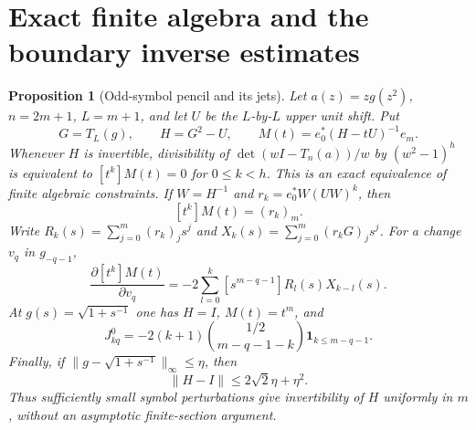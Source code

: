 \documentclass[11pt]{article}
\newtheorem{proposition}{Proposition}[section]
\begin{document}
\section{Exact finite algebra and the boundary inverse estimates}

\begin{proposition}[Odd-symbol pencil and its jets]
\label{prop:odd-pencil}
Let $a(z)=zg(z^2)$, $n=2m+1$, $L=m+1$, and let $U$ be the
$L$-by-$L$ upper unit shift. Put
\[
 G=T_L(g),\qquad H=G^2-U,\qquad
 M(t)=e_0^*(H-tU)^{-1}e_m.
\]
Whenever $H$ is invertible, divisibility of
$\det(wI-T_n(a))/w$ by $(w^2-1)^h$ is equivalent to
$[t^k]M(t)=0$ for $0\le k<h$.
This is an exact equivalence of finite algebraic constraints.
If $W=H^{-1}$ and $r_k=e_0^*W(UW)^k$, then
\[
 [t^k]M(t)=(r_k)_m.
\]
Write $R_k(s)=\sum_{j=0}^m(r_k)_js^j$ and
$X_k(s)=\sum_{j=0}^m(r_kG)_js^j$. For a change $v_q$ in $g_{-q-1}$,
\begin{equation}\label{eq:odd-pencil-jacobian}
 \frac{\partial [t^k]M(t)}{\partial v_q}
 =-2\sum_{l=0}^k[s^{m-q-1}]R_l(s)X_{k-l}(s).
\end{equation}
At $g(s)=\sqrt{1+s^{-1}}$ one has $H=I$, $M(t)=t^m$, and
\[
 J^0_{kq}=-2(k+1)\binom{1/2}{m-q-1-k}
             \mathbf1_{k\le m-q-1}.
\]
Finally, if $\|g-\sqrt{1+s^{-1}}\|_\infty\le\eta$, then
\[
 \|H-I\|\le 2\sqrt2\eta+\eta^2.
\]
Thus sufficiently small symbol perturbations give invertibility of $H$
uniformly in $m$, without an asymptotic finite-section argument.
\end{proposition}
\end{document}
